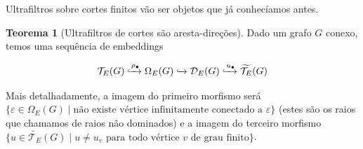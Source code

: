 \documentclass[11pt]{article}
\renewcommand{\textit}[1]{{\fakeitalic#1}}
\theoremstyle{definition}
\newtheorem{theorem}{Teorema}
\newenvironment{teorema}{
\definecolor{shadecolor}{HTML}{f59aa3}
\begin{shaded}
\begin{theorem}
}
{
\end{theorem}
\end{shaded}
}
\theoremstyle{definition}
\theoremstyle{definition}
\theoremstyle{definition}
\theoremstyle{definition}
\theoremstyle{definition}
\theoremstyle{definition}
\theoremstyle{definition}
\theoremstyle{definition}
\theoremstyle{definition}
\theoremstyle{definition}
\theoremstyle{definition}
\begin{document}
Ultrafiltros sobre cortes finitos vão ser objetos que já conhecíamos antes.

\begin{teorema}[Ultrafiltros de cortes são aresta-direções]

Dado um grafo $G$ conexo, temos uma sequência de embeddings

\[\mathcal{T}_E(G) \xhookrightarrow{\rho_\bullet} \Omega_E(G) \xhookrightarrow{} \mathcal{D}_E(G) \xhookrightarrow{u_\bullet} \widetilde{\mathcal{T}_E}(G)\]

Mais detalhadamente, a imagem do primeiro morfismo será $\{\varepsilon \in \Omega_E(G) \mid \text{não existe vértice infinitamente conectado a } \varepsilon\}$ (estes são os raios que chamamos de \textit{raios não dominados}) e a imagem do terceiro morfismo $\{u \in \widetilde{\mathcal{T}_E}(G) \mid u \neq u_v \text{ para todo vértice } v  \text{ de grau finito}\}$.
    
\end{teorema}
\end{document}
